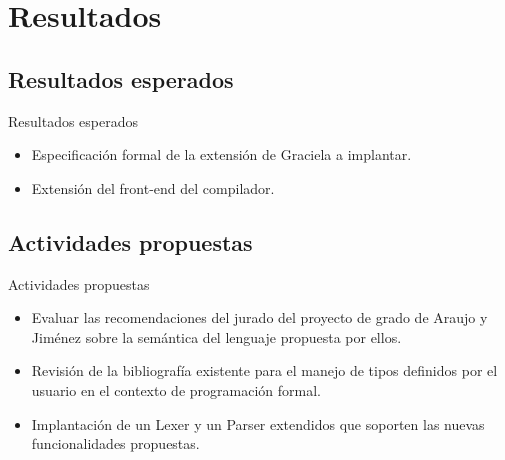 \section{Resultados}

\subsection{Resultados esperados}
\begin{frame}{Resultados esperados}
\begin{itemize}
  \item Especificación formal de la extensión de Graciela a implantar.
  \item Extensión del front-end del compilador.
\end{itemize}

\end{frame}

\subsection{Actividades propuestas}
\begin{frame}{Actividades propuestas}
\begin{itemize}
  \item Evaluar las recomendaciones del jurado del proyecto de grado de Araujo y
Jiménez sobre la semántica del lenguaje propuesta por ellos.
  \item Revisión de la bibliografía existente para el manejo de tipos definidos
por el usuario en el contexto de programación formal.
  \item Implantación de un Lexer y un Parser extendidos que soporten las nuevas
funcionalidades propuestas.
\end{itemize}

\end{frame}
